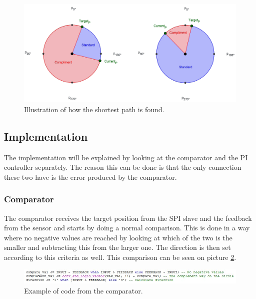 \begin{figure}[h!]
\centering
\includegraphics[scale=0.4]{Billeder/FPGA/Shortest_Comp_Short_and_Long.png}
\caption{Illustration of how the shortest path is found.}
\label{fig:Shortest_Comp_Short_and_Long}
\end{figure}


\subsection{Implementation}

The implementation will be explained by looking at the comparator and the PI controller separately. The reason this can be done is that the only connection these two have is the error produced by the comparator.


\subsubsection{Comparator}

The comparator receives the target position from the SPI slave and the feedback from the sensor and starts by doing a normal comparison. This is done in a way where no negative values are reached by looking at which of the two is the smaller and subtracting this from the larger one. The direction is then set according to this criteria as well. This comparison can be seen on picture \ref{fig:Comperator code exaple}.


\begin{figure}[h!]
\centering
\includegraphics[scale=0.7]{Billeder/FPGA/Comperator_code_exaple.jpg}
\caption{Example of code from the comparator.}
\label{fig:Comperator code exaple}
\end{figure}


